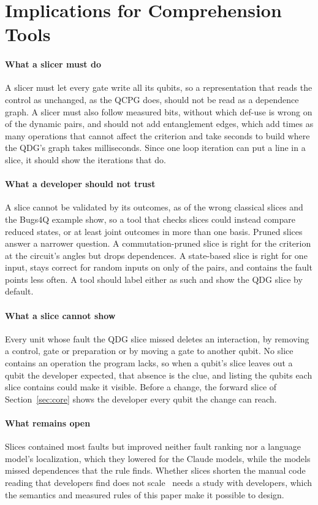 \section{Implications for Comprehension Tools}\label{sec:implications}

\paragraph*{What a slicer must do}
A slicer must let every gate write all its qubits, so a representation that reads the control as unchanged, as the
QCPG does, should not be read as a dependence graph.
A slicer must also follow measured bits, without which def-use is wrong on \numDuDynamicUnsound{} of the
\numNDynamicPairs{} dynamic pairs, and should not add entanglement edges, which add \numYzLcExcessRatio{} times as many
operations that cannot affect the criterion and take seconds to build where the QDG's graph takes milliseconds. Since one loop iteration can put a
line in a slice, it should show the iterations that do.

\paragraph*{What a developer should not trust}
A slice cannot be validated by its outcomes, as \numFdCpdgZMatchPct{} of the wrong classical slices and the Bugs4Q
example show, so a tool that checks slices could instead compare reduced states, or at least joint outcomes in more
than one basis. Pruned slices
answer a narrower question. A commutation-pruned slice is right for the criterion at the circuit's angles but drops dependences. A state-based
slice is right for one input, stays correct for random inputs on only \numHThreeRate{} of the pairs, and contains the
fault \numHFourDiffAbs{} points less often. A tool should label either as such and show the QDG slice by default.

\paragraph*{What a slice cannot show}
Every unit whose fault the QDG slice missed deletes an interaction, by removing a control, gate or preparation or by
moving a gate to another qubit. No slice contains an operation the program lacks, so when a qubit's slice leaves out a qubit
the developer expected, that absence is the clue, and listing the qubits each slice contains could make it visible. Before a change, the forward slice of Section~\ref{sec:core} shows the developer every qubit the change can reach.

\paragraph*{What remains open}
Slices contained most faults but improved neither fault ranking nor a language model's localization, which they
lowered for the Claude models, while the models missed dependences that the rule finds. Whether slices shorten the
manual code reading that developers find does not scale~\cite{zappin2026challenges} needs a study with developers,
which the semantics and measured rules of this paper make it possible to design.
